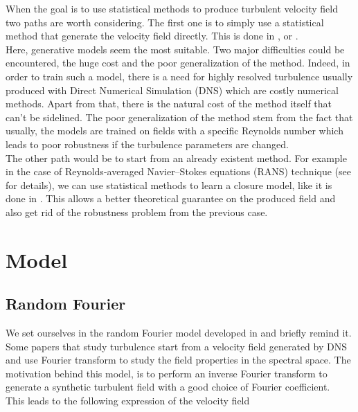 \documentclass[a4paper,12pt]{article}
\theoremstyle{definition}
\begin{document}

\bigskip

When the goal is to use statistical methods to produce turbulent velocity field two paths are worth considering. The first one is to simply use a statistical method that generate the velocity field directly. This is done in \cite{Yousif_Yu_Lim_2022},\cite{wang2025fourierflowfrequencyawareflowmatching} or \cite{parikh2025conditionalflowmatchinggenerative}. \\
Here, generative models seem the most suitable. Two major difficulties could be encountered, the huge cost and the poor generalization of the method. Indeed, in order to train such a model, there is a need for highly resolved turbulence usually produced with Direct Numerical Simulation (DNS) which are costly numerical methods. Apart from that, there is the natural cost of the method itself that can't be sidelined. The poor generalization of the method stem from the fact that usually, the models are trained on fields with a specific Reynolds number which leads to poor robustness if the turbulence parameters are changed. \\
The other path would be to start from an already existent method. For example in the case of Reynolds-averaged Navier–Stokes equations (RANS) technique (see \cite{} for details), we can use statistical methods to learn a closure model, like it is done in \cite{Bezgin2021}. This allows a better theoretical guarantee on the produced field and also get rid of the robustness problem from the previous case.  


\section{Model}

\subsection{Random Fourier}

We set ourselves in the random Fourier model developed in \cite{Janin2021} and briefly remind it. 
Some papers that study turbulence start from a velocity field generated by DNS and use Fourier transform to study the field properties in the spectral space. The motivation behind this model, is to perform an inverse Fourier transform to generate a synthetic turbulent field with a good choice of Fourier coefficient. \\
This leads to the following expression of the velocity field 
\end{document}
